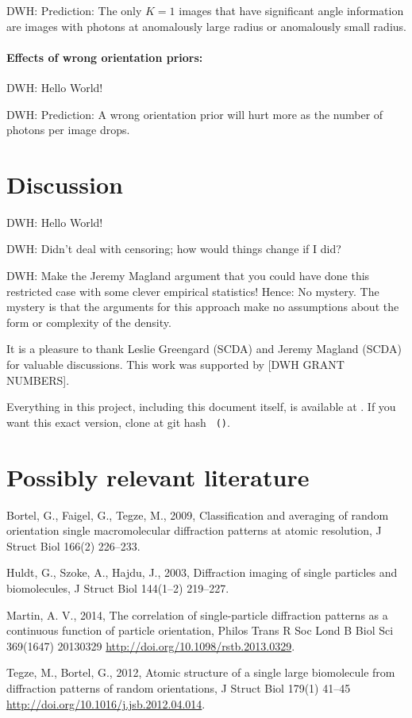 \documentclass[12pt]{article}
\newcommand{\doi}[1]{{\footnotesize \url{http://doi.org/#1}}}
\begin{document}
DWH: Prediction: The only $K=1$ images that have significant angle
information are images with photons at anomalously large radius or
anomalously small radius.

\paragraph{Effects of wrong orientation priors:}
DWH: Hello World!

DWH: Prediction: A wrong orientation prior will hurt more as the
number of photons per image drops.

\section{Discussion}

DWH: Hello World!

DWH: Didn't deal with censoring; how would things change if I did?

DWH: Make the Jeremy Magland argument that you could have done this
restricted case with some clever empirical statistics!  Hence: No
mystery.  The mystery is that the arguments for this approach make no
assumptions about the form or complexity of the density.

\bigskip

It is a pleasure to thank Leslie Greengard (SCDA) and Jeremy Magland
(SCDA) for valuable discussions.
This work was supported by [DWH GRANT NUMBERS].

Everything in this project, including this document itself, is
available at \giturl.  If you want this exact version, clone at git
hash \texttt{\githash~(\gitdate)}.

\section*{Possibly relevant literature}\raggedright
\begin{trivlist}
\item
Bortel, G., Faigel, G., Tegze, M., 2009,
Classification and averaging of random orientation single macromolecular diffraction patterns at atomic resolution,
J Struct Biol 166(2) 226--233.
\item
Huldt, G., Szoke, A., Hajdu, J., 2003,
Diffraction imaging of single particles and biomolecules,
J Struct Biol 144(1--2) 219--227.
\item
Martin, A. V., 2014,
The correlation of single-particle diffraction patterns as a continuous function of particle orientation,
Philos Trans R Soc Lond B Biol Sci 369(1647) 20130329
\doi{10.1098/rstb.2013.0329}.
\item
Tegze, M., Bortel, G., 2012,
Atomic structure of a single large biomolecule from diffraction patterns of random orientations,
J Struct Biol 179(1) 41--45
\doi{10.1016/j.jsb.2012.04.014}.
\end{trivlist}
\end{document}
